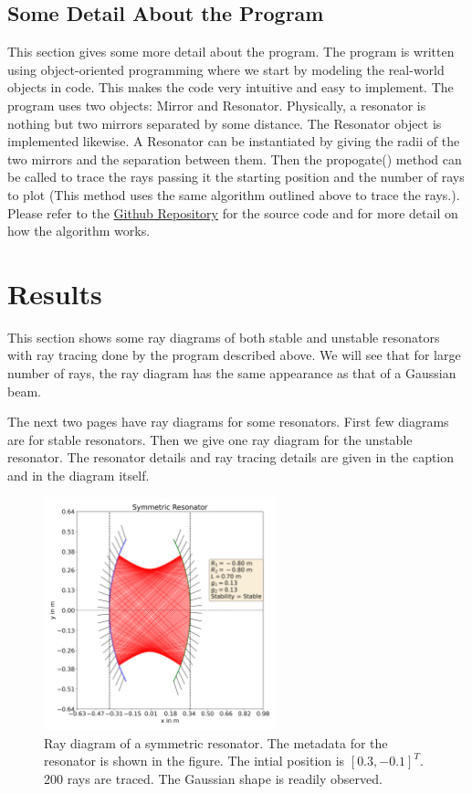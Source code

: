 \documentclass[12pt]{article}
\begin{document}
\subsection{Some Detail About the Program}
This section gives some more detail about the program. The program is written using {\color{cyan}object-oriented programming} where we start by modeling the real-world objects in code. This makes the code very intuitive and easy to implement. The program uses two objects: {\color{cyan}Mirror} and {\color{cyan}Resonator}. Physically, a resonator is nothing but two mirrors separated by some distance. The {\color{cyan}Resonator} object is implemented likewise. A {\color{cyan}Resonator} can be instantiated by giving the radii of the two mirrors and the separation between them. Then the {\color{cyan}propogate()}  method can be called to trace the rays passing it the starting position and the number of rays to plot (This method uses the same algorithm outlined above to trace the rays.). Please refer to the \href{https://github.com/Hari31416/Laser-Term-Paper}{Github Repository} for the source code and for more detail on how the algorithm works.

\section{Results}
This section shows some ray diagrams of both stable and unstable resonators with ray tracing done by the program described above. We will see that for large number of rays, the ray diagram has the same appearance as that of a Gaussian beam.

The next two pages have ray diagrams for some resonators. First few diagrams are for stable resonators. Then we give one ray diagram for the unstable resonator. The resonator details and ray tracing details are given in the caption and in the diagram itself.
\begin{figure}[h]
    \centering
    \includegraphics[width=0.6\textwidth]{images/symmetric.png}
    \caption{Ray diagram of a symmetric resonator. The metadata for the resonator is shown in the figure. The intial position is \([0.3, -0.1]^T\). 200 rays are traced. The Gaussian shape is readily observed.}
    \label{fig:symmetric}
\end{figure}
\end{document}
